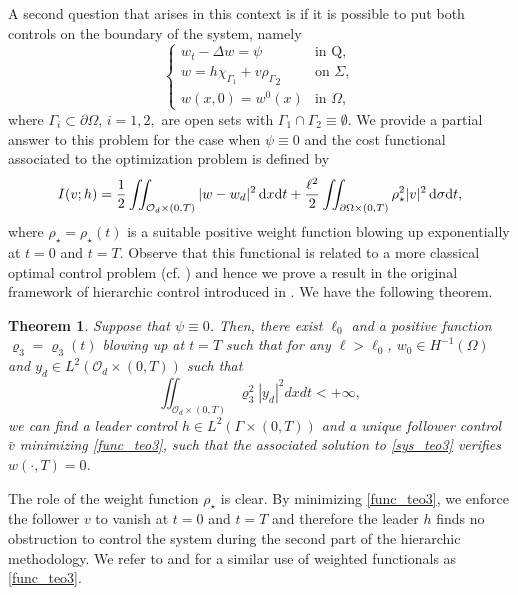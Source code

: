 \documentclass{dcds-bOF}
\newtheorem{theorem}{Theorem}[section]
\theoremstyle{definition}
\def\cbd{\Gamma}
\newcommand\csin[1]{\chi_{#1}}
\def\csbd{\rho_{\Gamma}}
\def\dx{\,\textnormal{d}x}
\def\dt{\textnormal{d}t}
\def\d{\,\textnormal{d}}
\begin{document}
A second question that arises in this context is if it is possible to put both controls on the boundary of the system, namely
%
\begin{equation}\label{sys_teo3}
\begin{cases}
w_t-\Delta w=\psi & \text{in Q}, \\
w= h\csin{\Gamma_1}+ v{\csbd}_{2} &\text{on } \Sigma, \\
w(x,0)=w^0(x) & \text{in } \Omega,
\end{cases}
\end{equation}
%
where $\Gamma_{i}\subset\partial \Omega$, $i=1,2,$ are open sets with $\cbd_1\cap\cbd_2\equiv \emptyset$. We provide a partial answer to this problem for the case when $\psi\equiv 0$ and the cost functional associated to the optimization problem is defined by
%
\begin{equation}\label{func_teo3}
I(v;h)=\frac{1}{2}\iint_{\mathcal O_d\times(0,T)}|w-w_d|^2\dx\dt+\frac{\ell^2}{2}\iint_{\partial\Omega\times(0,T)}\rho_\star^2|v|^2\d\sigma\dt,
\end{equation}
%
where $\rho_\star=\rho_\star(t)$ is a suitable positive weight function blowing up exponentially at $t=0$ and $t=T$. Observe that this functional is related to a more classical optimal control problem (cf. \cite{Lions_optim,trol}) and hence we prove a result in the original framework of hierarchic control introduced in \cite{LionsSta}. We have the following theorem.
%
\begin{theorem}\label{teo3}
Suppose that $\psi\equiv 0$. Then, there exist $\ell_0$ and a positive function $\varrho_3=\varrho_3(t)$ blowing up at $t=T$ such that for any $\ell>\ell_0$, $w_0\in H^{-1}(\Omega)$ and $y_d\in L^2(\mathcal O_d\times(0,T))$ such that
\begin{equation*}%
\iint_{\mathcal O_d\times(0,T)}\varrho_3^2|y_d|^2dxdt<+\infty,
\end{equation*}
we can find a leader control $h\in L^2(\cbd\times(0,T))$ and a unique follower control $\bar v$ minimizing \eqref{func_teo3}, such that the associated solution to \eqref{sys_teo3} verifies $w(\cdot,T)=0$.
\end{theorem}

The role of the weight function  $\rho_\star$ is clear. By minimizing \eqref{func_teo3}, we enforce the follower $v$ to vanish at $t=0$ and $t=T$ and therefore the leader $h$ finds no obstruction to control the system during the second part of the hierarchic methodology. We refer to \cite{araruna} and \cite{vhs_corri} for a similar use of weighted functionals as \eqref{func_teo3}.
\end{document}
